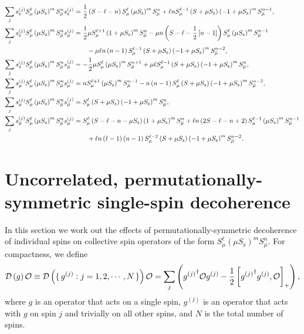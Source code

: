 \documentclass[pra,twocolumn,longbibliography]{revtex4-2}
\newcommand{\f}[2]{\dfrac{#1}{#2}} %
\newcommand{\p}[1]{\left( #1 \right)} %
\renewcommand{\sp}[1]{\left[ #1 \right]} %
\newcommand{\D}{\mathcal{D}}
\renewcommand{\O}{\mathcal{O}}
\newcommand{\z}{\text{z}}
\newcommand{\bmu}{{\bar\mu}}
\newcommand{\1}{\mathds{1}}
\begin{document}
\begin{align}
  \sum_j s_\z^{(j)} S_\mu^\ell \p{\mu S_\z}^m S_\bmu^n s_\z^{(j)}
  &= \f12 \p{S-\ell-n} S_\mu^\ell \p{\mu S_\z}^m S_\bmu^n
  + \ell n S_\mu^{\ell-1} \p{S+\mu S_\z}
  \p{-1+\mu S_\z}^m S_\bmu^{n-1},
  \label{eq:san_z_z} \allowdisplaybreaks \\
  \sum_j s_\z^{(j)} S_\mu^\ell \p{\mu S_\z}^m S_\bmu^n s_\mu^{(j)}
  &= \f12 \mu S_\mu^{\ell+1} \p{1+\mu S_\z}^m S_\bmu^n
  - \mu n \p{S-\ell-\f12\sp{n-1}} S_\mu^\ell
  \p{\mu S_\z}^m S_\bmu^{n-1} \notag \\
  &\qquad - \mu\ell n\p{n-1} S_\mu^{\ell-1}
  \p{S+\mu S_\z} \p{-1+\mu S_\z}^m S_\bmu^{n-2},
  \label{eq:san_z_mu} \allowdisplaybreaks \\
  \sum_j s_\z^{(j)} S_\mu^\ell \p{\mu S_\z}^m S_\bmu^n s_\bmu^{(j)}
  &= -\f12 \mu S_\mu^\ell \p{\mu S_\z}^m S_\bmu^{n+1}
  + \mu \ell S_\mu^{\ell-1} \p{S+\mu S_\z} \p{-1+\mu S_\z}^m S_\bmu^n,
  \label{eq:san_z_bmu} \allowdisplaybreaks \\
  \sum_j s_\mu^{(j)} S_\mu^\ell \p{\mu S_\z}^m S_\bmu^n s_\mu^{(j)}
  &= n S_\mu^{\ell+1} \p{\mu S_\z}^m S_\bmu^{n-1}
  - n\p{n-1} S_\mu^\ell \p{S+\mu S_\z} \p{-1+\mu S_\z}^m S_\bmu^{n-2},
  \label{eq:san_mu_mu} \allowdisplaybreaks \\
  \sum_j s_\mu^{(j)} S_\mu^\ell \p{\mu S_\z}^m S_\bmu^n s_\bmu^{(j)}
  &= S_\mu^\ell \p{S+\mu S_\z}\p{-1+\mu S_\z}^m S_\bmu^n,
  \label{eq:san_mu_bmu} \allowdisplaybreaks \\
  \sum_j s_\bmu^{(j)} S_\mu^\ell \p{\mu S_\z}^m S_\bmu^n s_\mu^{(j)}
  &= S_\mu^\ell \p{S - \ell - n - \mu S_\z}
  \p{1+\mu S_\z}^m S_\bmu^n
  + \ell n \p{2S - \ell - n + 2}
  S_\mu^{\ell-1} \p{\mu S_\z}^m S_\bmu^{n-1} \notag \\
  &\qquad + \ell n \p{\ell-1} \p{n-1} S_\mu^{\ell-2} \p{S+\mu S_\z}
  \p{-1+\mu S_\z}^m S_\bmu^{n-2}.
  \label{eq:san_bmu_mu}
\end{align}


\section{Uncorrelated, permutationally-symmetric single-spin
  decoherence}
\label{sec:decoherence_single}

In this section we work out the effects of permutationally-symmetric
decoherence of individual spins on collective spin operators of the
form $S_\mu^\ell \p{\mu S_\z}^m S_\bmu^n$.  For compactness, we define
\begin{align}
  \D\p{g} \O
  \equiv \D\p{\set{g^{(j)}:j=1,2,\cdots,N}} \O
  = \sum_j\p{{g^{(j)}}^\dag \O g^{(j)}
    - \f12\sp{{g^{(j)}}^\dag g^{(j)}, \O}_+},
\end{align}
where $g$ is an operator that acts on a single spin, $g^{(j)}$ is an
operator that acts with $g$ on spin $j$ and trivially on all other
spins, and $N$ is the total number of spins.
\end{document}

